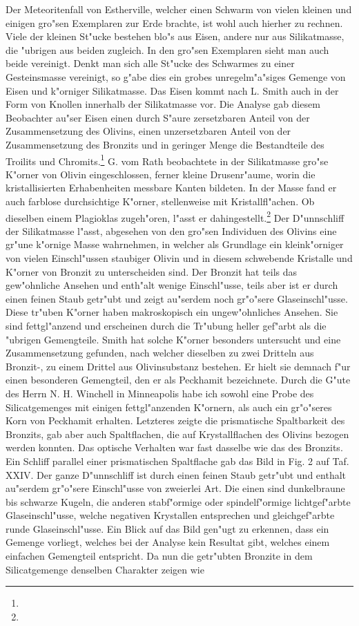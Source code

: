 \documentclass[a4paper, 11pt, oneside, polutonikogreek, german]{article}
\begin{document}
Der Meteoritenfall von Estherville, welcher einen Schwarm von vielen kleinen und einigen gro"sen Exemplaren zur Erde brachte, ist wohl auch hierher zu rechnen. Viele der kleinen St"ucke bestehen blo"s aus Eisen, andere nur aus Silikatmasse, die "ubrigen aus beiden zugleich. In den gro"sen Exemplaren sieht man auch beide vereinigt. Denkt man sich alle St"ucke des Schwarmes zu einer Gesteinsmasse vereinigt, so g"abe dies ein grobes unregelm"a"siges Gemenge von Eisen und k"orniger Silikatmasse. Das Eisen kommt nach L. Smith auch in der Form von Knollen innerhalb der Silikatmasse vor. Die Analyse gab diesem Beobachter au"ser Eisen einen durch S"aure zersetzbaren Anteil von der Zusammensetzung des Olivins, einen unzersetzbaren Anteil von der Zusammensetzung des Bronzits und in geringer Menge die Bestandteile des Troilits und Chromits.\footnote{} G. vom Rath beobachtete in der Silikatmasse gro"se K"orner von Olivin eingeschlossen, ferner kleine Drusenr"aume, worin die kristallisierten Erhabenheiten messbare Kanten bildeten. In der Masse fand er auch farblose durchsichtige K"orner, stellenweise mit Kristallfl"achen. Ob dieselben einem Plagioklas zugeh"oren, l"asst er dahingestellt.\footnote{} Der D"unnschliff der Silikatmasse l"asst, abgesehen von den gro"sen Individuen des Olivins eine gr"une k"ornige Masse wahrnehmen, in welcher als Grundlage ein kleink"orniger von vielen Einschl"ussen staubiger Olivin und in diesem schwebende Kristalle und K"orner von Bronzit zu unterscheiden sind. Der Bronzit hat teils das gew"ohnliche Ansehen und enth"alt wenige Einschl"usse, teils aber ist er durch einen feinen Staub getr"ubt und zeigt au"serdem noch gr"o"sere Glaseinschl"usse. Diese tr"uben K"orner haben makroskopisch ein ungew"ohnliches Ansehen. Sie sind fettgl"anzend und erscheinen durch die Tr"ubung heller gef"arbt als die "ubrigen Gemengteile. Smith hat solche K"orner besonders untersucht und eine Zusammensetzung gefunden, nach welcher dieselben zu zwei Dritteln aus Bronzit-, zu einem Drittel aus Olivinsubstanz bestehen. Er hielt sie demnach f"ur einen besonderen Gemengteil, den er als Peckhamit bezeichnete. Durch die G"ute des Herrn N. H. Winchell in Minneapolis habe ich sowohl eine Probe des Silicatgemenges mit einigen fettgl"anzenden K"ornern, als auch ein gr"o"seres Korn von Peckhamit erhalten. Letzteres zeigte die prismatische Spaltbarkeit des Bronzits, gab aber auch Spaltflachen, die auf Krystallflachen des Olivins bezogen werden konnten. Das optische Verhalten war fast dasselbe wie das des Bronzits. Ein Schliff parallel einer prismatischen Spaltflache gab das Bild in Fig. 2 auf Taf. XXIV. Der ganze D"unnschliff ist durch einen feinen Staub getr"ubt und enthalt au"serdem gr"o"sere Einschl"usse von zweierlei Art. Die einen sind dunkelbraune bis schwarze Kugeln, die anderen stabf"ormige oder spindelf"ormige lichtgef"arbte Glaseinschl"usse, welche negativen Krystallen entsprechen und gleichgef"arbte runde Glaseinschl"usse. Ein Blick auf das Bild gen"ugt zu erkennen, dass ein Gemenge vorliegt, welches bei der Analyse kein Resultat gibt, welches einem einfachen Gemengteil entspricht. Da nun die getr"ubten Bronzite in dem Silicatgemenge denselben Charakter zeigen wie 
\end{document}
